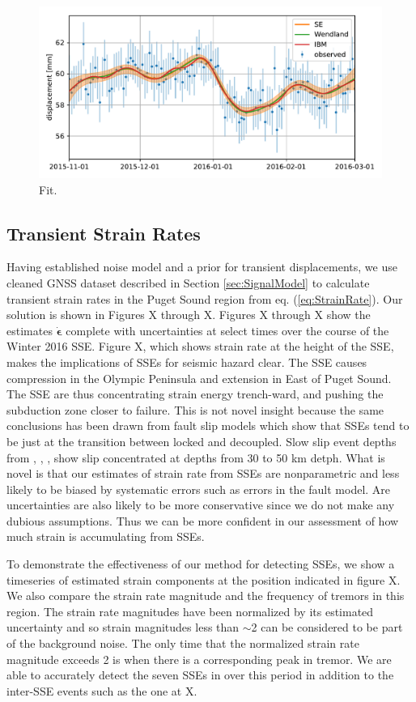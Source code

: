 \documentclass[10pt,a4paper]{article}
\begin{document}
\begin{figure}
\includegraphics{figures/signal_fit/signal-fit.pdf}
\caption{Fit.}   
\label{fig:Fit}
\end{figure}

\subsection{Transient Strain Rates} 
Having established noise model and a prior for transient displacements, we use cleaned GNSS dataset described in Section \ref{sec:SignalModel} to calculate transient strain rates in the Puget Sound region from eq. (\ref{eq:StrainRate}). Our solution is shown in Figures X through X. Figures X through X show the estimates $\dot{\bm{\epsilon}}$ complete with uncertainties at select times over the course of the Winter 2016 SSE. Figure X, which shows strain rate at the height of the SSE, makes the implications of SSEs for seismic hazard clear.  The SSE causes compression in the Olympic Peninsula and extension in East of Puget Sound. The SSE are thus concentrating strain energy trench-ward, and pushing the subduction zone closer to failure. This is not novel insight because the same conclusions has been drawn from fault slip models which show that SSEs tend to be just at the transition between locked and decoupled. Slow slip event depths from \citet{Dragert2001}, \citet{Wech2009}, \citet{Schmidt2010}, \citet{Bartlow2011} show slip concentrated at depths from 30 to 50 km detph. What is novel is that our estimates of strain rate from SSEs are nonparametric and less likely to be biased by systematic errors such as errors in the fault model. Are uncertainties are also likely to be more conservative since we do not make any dubious assumptions. Thus we can be more confident in our assessment of how much strain is accumulating from SSEs.

To demonstrate the effectiveness of our method for detecting SSEs, we show a timeseries of estimated strain components at the position indicated in figure X.  We also compare the strain rate magnitude and the frequency of tremors in this region.  The strain rate magnitudes have been normalized by its estimated uncertainty and so strain magnitudes less than ${\sim}$2 can be considered to be part of the background noise. The only time that the normalized strain rate magnitude exceeds 2 is when there is a corresponding peak in tremor.  We are able to accurately detect the seven SSEs in over this period in addition to the inter-SSE events such as the one at X.      
\end{document}
